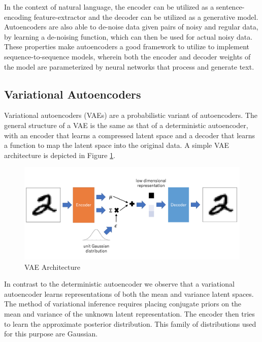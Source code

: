 In the context of natural language, the encoder can be utilized as a sentence-encoding feature-extractor and the decoder can be utilized as a generative model. Autoencoders are also able to de-noise data given pairs of noisy and regular data, by learning a de-noising function, which can then be used for actual noisy data. These properties make autoencoders a good framework to utilize to implement sequence-to-sequence models, wherein both the encoder and decoder weights of the model are parameterized by neural networks that process and generate text.

\subsection{Variational Autoencoders}

Variational autoencoders (VAEs) \citep{kingma2013auto} are a probabilistic variant of autoencoders. The general structure of a VAE is the same as that of a deterministic autoencoder, with an encoder that learns a compressed latent space and a decoder that learns a function to map the latent space into the original data. A simple VAE architecture is depicted in Figure \ref{fig:vae-structure}.

\begin{figure}[ht]
	\centering
	\includegraphics[width=\textwidth]{images/vae-structure}
	\caption{\label{fig:vae-structure} VAE Architecture}
\end{figure}

In contrast to the deterministic autoencoder we observe that a variational autoencoder learns representations of both the mean and variance latent spaces. The method of variational inference requires placing conjugate priors on the mean and variance of the unknown latent representation. The encoder then tries to learn the approximate posterior distribution. This family of distributions used for this purpose are Gaussian.

